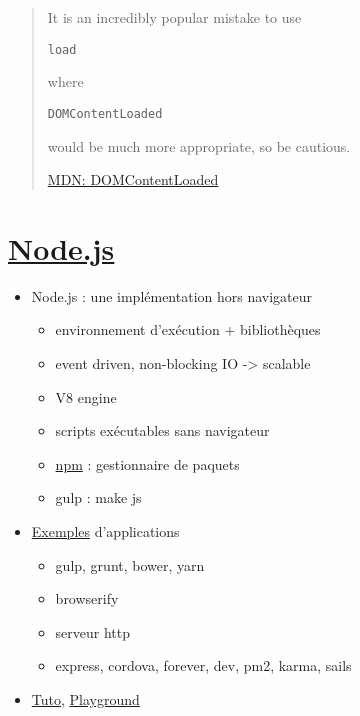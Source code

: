 \begin{quote}
It is an incredibly popular mistake to use
\begin{otherlanguage}{english}\texttt{load}\end{otherlanguage} where
\begin{otherlanguage}{english}\texttt{DOMContentLoaded}\end{otherlanguage}
would be much more appropriate, so be cautious.

\href{https://developer.mozilla.org/en/docs/Web/Events/DOMContentLoaded}{MDN:
DOMContentLoaded}
\end{quote}

\hypertarget{node.js}{%
\section{\texorpdfstring{\href{https://nodejs.org}{Node.js}}{Node.js}}\label{node.js}}

\begin{itemize}
\tightlist
\item
  Node.js : une implémentation hors navigateur

  \begin{itemize}
  \tightlist
  \item
    environnement d'exécution + bibliothèques
  \item
    event driven, non-blocking IO -\textgreater{} scalable
  \item
    V8 engine
  \item
    scripts exécutables sans navigateur
  \item
    \href{https://www.npmjs.com}{npm} : gestionnaire de paquets
  \item
    gulp : make js
  \end{itemize}
\item
  \href{https://docs.google.com/spreadsheets/d/1LyRwn6E8k7NM5bw2hJ7pWD7BWjgN_EskQ0ZMNphrffE}{Exemples}
  d'applications

  \begin{itemize}
  \tightlist
  \item
    gulp, grunt, bower, yarn
  \item
    browserify
  \item
    serveur http
  \item
    express, cordova, forever, dev, pm2, karma, sails
  \end{itemize}
\item
  \href{https://www.tutorialspoint.com/nodejs/index.htm}{Tuto},
  \href{https://runkit.com}{Playground}
\end{itemize}

